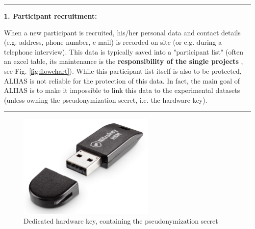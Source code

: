 \par\noindent\rule{\textwidth\color{pniblue}}{0.4pt}
\textbf{1. Participant recruitment:}
When a new participant is recruited, his/her personal data and contact details (e.g. address, phone number, e-mail) is recorded on-site (or e.g. during a telephone interview). This data is typically saved into a "participant list" (often an excel table, its maintenance is the \textbf{responsibility of the single projects} , see Fig. \ref{fig:flowchart}). While this participant list itself is also to be protected, ALIIAS is not reliable for the protection of this data. In fact, the main goal of ALIIAS is to make it impossible to link this data to the experimental datasets (unless owning the pseudonymization secret, i.e. the hardware key).


\par\noindent\rule{\textwidth\color{pniblue}}{0.4pt}


\begin{figure}
\centering
\includegraphics[width=0.6\textwidth]{docs/fig/hwkey.png}
\caption{Dedicated hardware key, containing the pseudonymization secret}
\label{fig:hw_key}
\end{figure}



